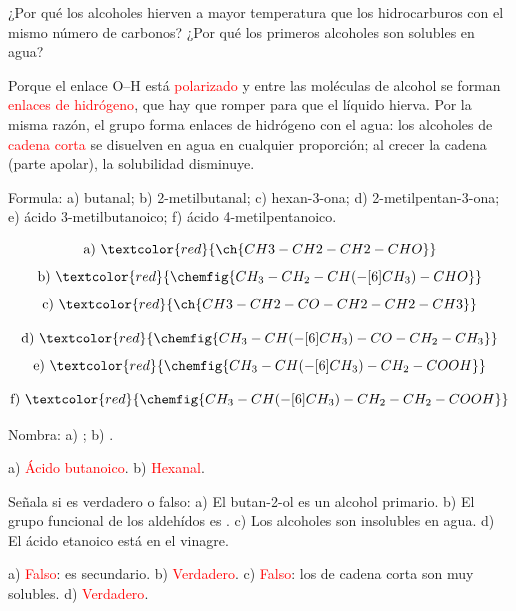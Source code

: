\begin{exercise}
    ¿Por qué los alcoholes hierven a mayor temperatura que los hidrocarburos con el mismo número de carbonos? ¿Por qué los primeros alcoholes son solubles en agua?
    \begin{solu}
        Porque el enlace O--H está \textcolor{red}{polarizado} y entre las moléculas de alcohol se forman \textcolor{red}{enlaces de hidrógeno}, que hay que romper para que el líquido hierva. Por la misma razón, el grupo  forma enlaces de hidrógeno con el agua: los alcoholes de \textcolor{red}{cadena corta} se disuelven en agua en cualquier proporción; al crecer la cadena (parte apolar), la solubilidad disminuye.
    \end{solu}
\end{exercise}

\begin{exercise}
    Formula: a) butanal; b) 2-metilbutanal; c) hexan-3-ona; d) 2-metilpentan-3-ona; e) ácido 3-metilbutanoico; f) ácido 4-metilpentanoico.
    \begin{solu}
        \[ \text{a)}\ \textcolor{red}{\ch{CH3-CH2-CH2-CHO}} \]
        \[ \text{b)}\ \textcolor{red}{\chemfig{CH_3-CH_2-CH(-[6]CH_3)-CHO}} \]
        \[ \text{c)}\ \textcolor{red}{\ch{CH3-CH2-CO-CH2-CH2-CH3}} \]

        \[ \text{d)}\ \textcolor{red}{\chemfig{CH_3-CH(-[6]CH_3)-CO-CH_2-CH_3}} \]
        \[ \text{e)}\ \textcolor{red}{\chemfig{CH_3-CH(-[6]CH_3)-CH_2-COOH}} \]

        \[ \text{f)}\ \textcolor{red}{\chemfig{CH_3-CH(-[6]CH_3)-CH_2-CH_2-COOH}} \]
    \end{solu}
\end{exercise}

\begin{exercise}
    Nombra: a) ; b) .
    \begin{solu}
        a) \textcolor{red}{Ácido butanoico}. b) \textcolor{red}{Hexanal}.
    \end{solu}
\end{exercise}

\begin{exercise}
    Señala si es verdadero o falso: a) El butan-2-ol es un alcohol primario. b) El grupo funcional de los aldehídos es . c) Los alcoholes son insolubles en agua. d) El ácido etanoico está en el vinagre.
    \begin{solu}
        a) \textcolor{red}{Falso}: es secundario. b) \textcolor{red}{Verdadero}. c) \textcolor{red}{Falso}: los de cadena corta son muy solubles. d) \textcolor{red}{Verdadero}.
    \end{solu}
\end{exercise}

